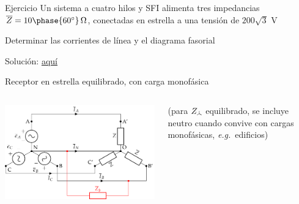 \documentclass[aspectratio=169, usenames,svgnames,dvipsnames]{beamer}
\newcommand\wye{\scalerel*{\stackengine{-1pt}{%
  \rotatebox[origin=c]{30}{\rule{10pt}{.9pt}}\kern-1pt%
  \rotatebox[origin=c]{-30}{\rule{10pt}{1.3pt}}}{%
  \rule{.9pt}{10pt}}{O}{c}{F}{F}{S}}{\Delta}} %
\begin{document}

\begin{frame}{Ejercicio}
    \vspace{19mm}
    Un sistema a cuatro hilos y SFI alimenta tres impedancias $\overline{Z}=10\phase{60^\circ}\,\Omega$, conectadas en estrella a una tensión de $200\sqrt{3}$ \si{\volt} 

    \vspace{5mm}
    Determinar las corrientes de línea y el diagrama fasorial

    \vspace{28mm}
    \alert{Solución}: \href{https://raw.githubusercontent.com/ETSIDI-IE/tc/master/docs/ejercicios_clase/TC1_03_Ejemplo_3_1_libro_LBB.pdf}{aquí}
\end{frame}


\begin{frame}{Receptor en estrella equilibrado, \hspace{3mm}con carga monofásica}
    \begin{columns}
    \begin{column}{0.8\columnwidth}
        \vspace{3mm}
        
        \hspace*{9mm}
        \includegraphics[height=0.9\textheight]{../figs/Estrella_CargaMonofasica.pdf}
    \end{column}
    \begin{column}{0.2\columnwidth}
        \vspace{-40mm}
        \begin{center}
            \footnotesize{(para $Z_{\wye}$ equilibrado, se incluye neutro cuando convive con cargas monofásicas, \textit{e.g.}~edificios)}
        \end{center}
    \end{column}
    \end{columns}    
\end{frame}
\end{document}
